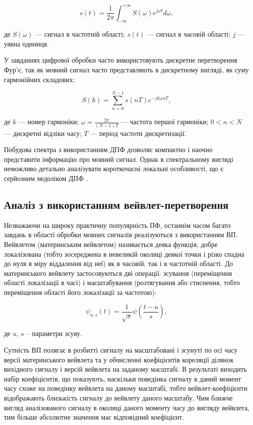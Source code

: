 \begin{equation}
\label{eq:equation2}
s(t)=\frac{1}{2\pi}\int_{-\infty}^{+\infty}S(\omega)e^{j\omega t}d\omega,
\end{equation}

\noindent
де $S(\omega)$ --- сигнал в частотній області; $s(t)$ --- сигнал в часовій області; $j$ --- уявна одиниця.

У завданнях цифрової обробки часто використовують дискретне перетворення Фур'є, так як мовний сигнал часто представляють в дискретному вигляді, як суму гармонійних складових:

\begin{equation}
\label{eq:equation3}
S(k)=\sum_{n=0}^{N-1}s(nT)e^{-jk\omega nT},
\end{equation}

\noindent
де $k$ --- номер гармоніки; $\omega=\frac{2\pi}{(N-1)T}$ --- частота першої гармоніки; $0<n<N$ --- дискретні відліки часу; $T$ --- період частоти дискретизації.

Побудова спектра з використанням ДПФ дозволяє компактно і наочно представити інформацію про мовний сигнал. Однак в спектральному вигляді неможливо детально аналізувати короткочасні локальні особливості, що є серйозним недоліком ДПФ \cite{Сергиенко_2002}.

\subsection{Аналіз з використанням вейвлет-перетворення}

Незважаючи на широку практичну популярність ПФ, останнім часом багато завдань в області обробки мовних сигналів реалізуються з використанням ВП. Вейвлетом (материнським вейвлетом) називається деяка функція, добре локалізована (тобто зосереджена в невеликій околиці деякої точки і різко спадна до нуля в міру віддалення від неї) як в часовій, так і в частотній області. До материнського вейвлету застосовуються дві операції: зсування (переміщення області локалізації в часі) і масштабування (розтягування або стиснення, тобто переміщення області його локалізації за частотою):

\begin{equation}
\label{eq:equation4}
\psi_{u,s}(t)=\frac{1}{\sqrt{s}}\psi(\frac{t-u}{s}),
\end{equation}

\noindent
де $u$, $s$ – параметри зсуву.

Сутність ВП полягає в розбитті сигналу на масштабовані і зсунуті по осі часу версії материнського вейвлета та у обчисленні коефіцієнтів кореляції ділянок вихідного сигналу і версій вейвлета на заданому масштабі. В результаті виходить набір коефіцієнтів, що показують, наскільки поведінка сигналу в даний момент часу схоже на поведінку вейвлета на даному масштабі, тобто вейвлет-коефіцієнти відображають близькість сигналу до вейвлету даного масштабу. Чим ближче вигляд аналізованого сигналу в околиці даного моменту часу до вигляду вейвлета, тим більше абсолютне значення має відповідний коефіцієнт.


